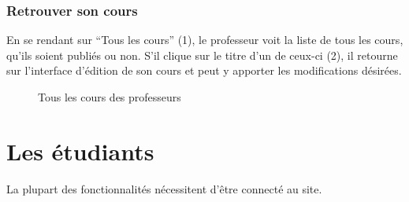 \documentclass[a4paper,10pt,twoside]{sphinxmanual}
\begin{document}
\subsubsection{Retrouver son cours}
\label{functionalities:retrouver-son-cours}
En se rendant sur ``Tous les cours'' (1), le professeur voit la liste de tous les cours, qu'ils soient publiés ou non. S'il clique sur le titre d'un de ceux-ci (2), il retourne sur l'interface d'édition de son cours et peut y apporter les modifications désirées.
\begin{figure}[htbp]
\centering
\capstart

\caption{Tous les cours des professeurs}\end{figure}


\section{Les étudiants}
\label{functionalities:les-etudiants}
La plupart des fonctionnalités nécessitent d'être connecté au site.
\end{document}
